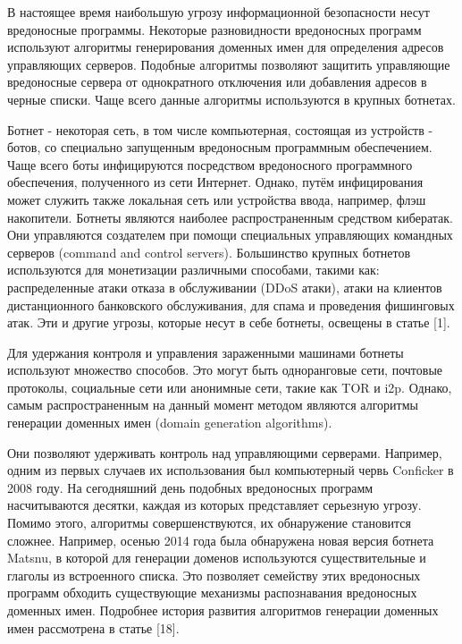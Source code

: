 
В настоящее время наибольшую угрозу информационной безопасности несут вредоносные программы. Некоторые разновидности вредоносных программ используют алгоритмы генерирования доменных имен для определения адресов управляющих серверов. Подобные алгоритмы позволяют защитить управляющие вредоносные сервера от однократного отключения или добавления адресов в черные списки. Чаще всего данные алгоритмы используются в крупных ботнетах.

Ботнет - некоторая сеть, в том числе компьютерная, состоящая из устройств - ботов, со специально запущенным вредоносным программным обеспечением. Чаще всего боты инфицируются посредством вредоносного программного обеспечения, полученного из сети Интернет. Однако, путём инфицирования может служить также локальная сеть или устройства ввода, например, флэш накопители. Ботнеты являются наиболее распространенным средством кибератак. Они управляются создателем при помощи специальных управляющих командных серверов (command and control servers). Большинство крупных ботнетов используются для монетизации различными способами, такими как: распределенные атаки отказа в обслуживании (DDoS атаки), атаки на клиентов дистанционного банковского обслуживания, для спама и проведения фишинговых атак. Эти и другие угрозы, которые несут в себе ботнеты, освещены в статье [1].

Для удержания контроля и управления зараженными машинами ботнеты используют множество способов. Это могут быть одноранговые сети, почтовые протоколы, социальные сети или анонимные сети, такие как TOR и i2p.
Однако, самым распространенным на данный момент методом являются алгоритмы генерации доменных имен (domain generation algorithms).

Они позволяют удерживать контроль над управляющими серверами. Например, одним из первых случаев их использования был компьютерный червь Conficker в 2008 году. На сегодняшний день подобных вредоносных программ насчитываются десятки, каждая из которых представляет серьезную угрозу. Помимо этого, алгоритмы совершенствуются, их обнаружение становится сложнее. Например, осенью 2014 года была обнаружена новая версия ботнета Matsnu, в которой для генерации доменов используются существительные и глаголы из встроенного списка. Это позволяет семейству этих вредоносных программ обходить существующие механизмы распознавания вредоносных доменных имен. Подробнее история развития алгоритмов генерации доменных имен рассмотрена в статье [18].

